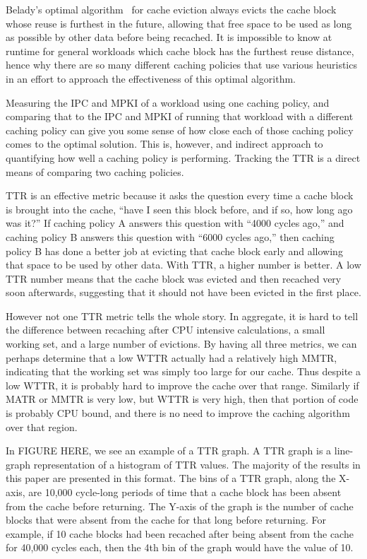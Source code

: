 Belady's optimal algorithm~\cite{belady66} for cache eviction always
evicts
the cache block whose reuse is furthest in the future, allowing that
free space to be used as long as possible by other data before being
recached.  It is impossible to know at runtime for general workloads
which cache block has the furthest reuse distance, hence why there are
so many different caching policies that use various heuristics in an
effort to approach the effectiveness of this optimal algorithm.

Measuring the IPC and MPKI of a workload using one caching policy, and
comparing that to the IPC and MPKI of running that workload with a
different caching policy can give you some sense of how close each of
those caching policy comes to the optimal solution.  This is,
however, and indirect approach to quantifying how well a caching
policy is performing.  Tracking the TTR is a direct means of
comparing two caching policies.

TTR is an effective metric because it asks the question every time a
cache block is brought into the cache, ``have I seen this block
before, and if so, how long ago was it?''  If caching policy A answers
this question with ``4000 cycles ago,'' and caching policy B answers
this question with ``6000 cycles ago,'' then caching policy B has done
a better job at evicting that cache block early and allowing that
space to be used by other data.  With TTR, a higher number is better.
A low TTR number means that the cache block was evicted and then
recached very soon afterwards, suggesting that it should not have
been evicted in the first place.

However not one TTR metric tells the whole story.
In aggregate, it is hard to tell the difference between recaching after CPU intensive calculations, a small working set, and a large number of evictions.
By having all three metrics, we can perhaps determine that a low WTTR actually had a relatively high MMTR, indicating that the working set was simply too large for our cache.
Thus despite a low WTTR, it is probably hard to improve the cache over that range.
Similarly if MATR or MMTR is very low, but WTTR is very high, then that portion of code is probably CPU bound, and there is no need to improve the caching algorithm over that region.

In FIGURE HERE, we see an example of a TTR graph.  A TTR graph is a
line-graph representation of a histogram of TTR values.  The majority
of
the results in this paper are presented in this format.  The bins of a
TTR graph, along the X-axis,  are 10,000 cycle-long periods of time
that a cache block has
been absent from the cache before returning.  The Y-axis of the graph
is the number of cache blocks that were absent from the cache for that
long before returning.  For example, if 10 cache blocks had been
recached after being absent from the cache for 40,000 cycles each,
then the 4th bin of the graph would have the value of 10.

